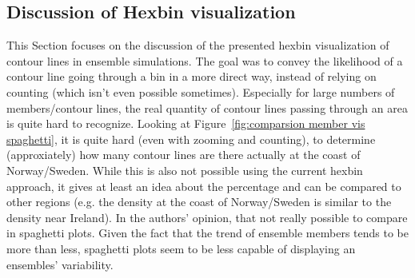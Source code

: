 
\subsection{Discussion of Hexbin visualization}


This Section focuses on the discussion of the presented hexbin visualization of contour lines in ensemble simulations. 
The goal was to convey the likelihood of a contour line going through a bin in a more direct way, instead of relying on counting (which isn't even possible sometimes). 
Especially for large numbers of members/contour lines, the real quantity of contour lines passing through an area is quite hard to recognize. 
Looking at Figure~\ref{fig:comparsion member vis spaghetti}, it is quite hard (even with zooming and counting), to determine (approxiately) how many contour lines are there actually at the coast of Norway/Sweden.
While this is also not possible using the current hexbin approach, it gives at least an idea about the percentage and can be compared to other regions (e.g. the density at the coast of Norway/Sweden is similar to the density near Ireland). 
In the authors' opinion, that not really possible to compare in spaghetti plots. 
Given the fact that the trend of ensemble members tends to be more than less, spaghetti plots seem to be less capable of displaying an ensembles' variability. 


